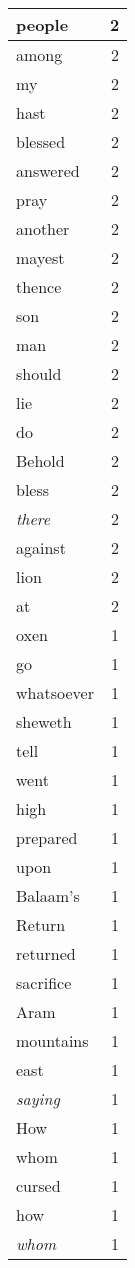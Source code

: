 \begin{center}
\begin{longtable}{l|r}
people & 2\\ \hline 
among & 2\\ \hline 
my & 2\\ \hline 
hast & 2\\ \hline 
blessed & 2\\ \hline 
answered & 2\\ \hline 
pray & 2\\ \hline 
another & 2\\ \hline 
mayest & 2\\ \hline 
thence & 2\\ \hline 
son & 2\\ \hline 
man & 2\\ \hline 
should & 2\\ \hline 
lie & 2\\ \hline 
do & 2\\ \hline 
Behold & 2\\ \hline 
bless & 2\\ \hline 
\emph{there} & 2\\ \hline 
against & 2\\ \hline 
lion & 2\\ \hline 
at & 2\\ \hline 
oxen & 1\\ \hline 
go & 1\\ \hline 
whatsoever & 1\\ \hline 
sheweth & 1\\ \hline 
tell & 1\\ \hline 
went & 1\\ \hline 
high & 1\\ \hline 
prepared & 1\\ \hline 
upon & 1\\ \hline 
Balaam's & 1\\ \hline 
Return & 1\\ \hline 
returned & 1\\ \hline 
sacrifice & 1\\ \hline 
Aram & 1\\ \hline 
mountains & 1\\ \hline 
east & 1\\ \hline 
\emph{saying} & 1\\ \hline 
How & 1\\ \hline 
whom & 1\\ \hline 
cursed & 1\\ \hline 
how & 1\\ \hline 
\emph{whom} & 1\\ \hline 

\end{longtable}
\end{center}
